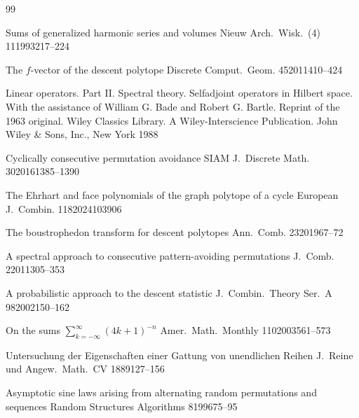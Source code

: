 \documentclass[11pt,reqno]{amsart}
\theoremstyle{definition}
\numberwithin{equation}{section}
\begin{document}
\begin{thebibliography}{99}

            {Sums of generalized harmonic series and volumes}
            {Nieuw Arch.\ Wisk.\ (4)}
            {11}{1993}{217--224}

            {The $f$-vector of the descent polytope}
            {Discrete Comput.\ Geom.}
            {45}{2011}{410--424}
            
         {Linear operators. Part II. Spectral theory.
         Selfadjoint operators in Hilbert space.
         With the assistance of William G. Bade and Robert G. Bartle. Reprint of the 1963 original. Wiley Classics Library.}
          {A Wiley-Interscience Publication. John Wiley \& Sons, Inc., New York}
          {1988}

            {Cyclically consecutive permutation avoidance}
            {SIAM J.\ Discrete Math.}
            {30}{2016}{1385--1390}

            {The Ehrhart and face polynomials of the graph polytope of a cycle}
            {European J.\ Combin.}
            {118}{2024}{103906}

        {The boustrophedon transform for descent polytopes}
        {Ann.\ Comb.}
        {23}{2019}{67--72}

             {A spectral approach to consecutive pattern-avoiding permutations}
             {J.\ Comb.}
             {2}{2011}{305--353}

            {A probabilistic approach to the descent statistic}
            {J.\ Combin.\ Theory Ser.\ A}
            {98}{2002}{150--162}

            {On the sums $\sum_{k=-\infty}^{\infty}(4k + 1)^{-n}$}
            {Amer.\ Math.\ Monthly}
            {110}{2003}{561--573}
            
            {Untersuchung der Eigenschaften
             einer Gattung von unendlichen Reihen}
            {J.\ Reine und Angew.\ Math.\ CV}
            {}{1889}{127--156}

            {Asymptotic sine laws arising from 
             alternating random permutations and 
             sequences}
             {Random Structures Algorithms}
             {8}{1996}{75--95}

\end{thebibliography}
\end{document}
